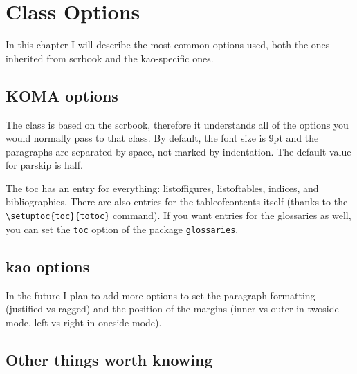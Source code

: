 \setchapterpreamble[u]{\margintoc}
\chapter{Class Options}

In this chapter I will describe the most common options used, both the 
ones inherited from scrbook and the kao-specific ones.

\section{KOMA options}

The class is based on the scrbook, therefore it understands all of the 
options you would normally pass to that class. By default, the font size 
is 9pt and the paragraphs are separated by space, not marked by 
indentation. The default value for parskip is half.

The toc has an entry for everything: listoffigures, listoftables, 
indices, and bibliographies. There are also entries for the 
tableofcontents itself (thanks to the \verb|\setuptoc{toc}{totoc}| 
command). If you want entries for the glossaries as well, you can set 
the \verb|toc| option of the package \verb|glossaries|.

\section{kao options}

In the future I plan to add more options to set the paragraph formatting 
(justified vs ragged) and the position of the margins (inner vs outer in 
twoside mode, left vs right in oneside mode). 

\section{Other things worth knowing}


